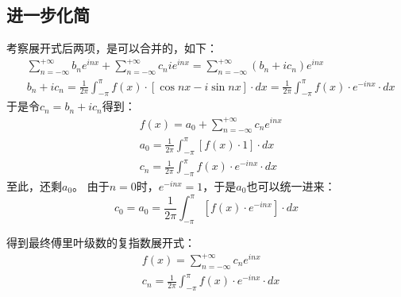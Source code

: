 \subsection{进一步化简}

考察展开式后两项，是可以合并的，如下：
\begin{align*}
&\sum_{n=-\infty}^{+\infty}{b_ne^{inx}}+\sum_{n=-\infty}^{+\infty}{c_nie^{inx}}=\sum_{n=-\infty}^{+\infty}{\left( b_n+ic_n \right) e^{inx}} \\
&b_n+ic_n=\frac{1}{2\pi}\int_{-\pi}^{\pi}{f\left( x \right) \cdot \left[ \cos nx-i\sin nx \right] \cdot dx}=\frac{1}{2\pi}\int_{-\pi}^{\pi}{f\left( x \right) \cdot e^{-inx}\cdot dx}
\end{align*}
于是令$c_n=b_n+ic_n$得到：
\begin{align*}
&f\left( x \right) =a_0+\sum_{n=-\infty}^{+\infty}{c_ne^{inx}} \\
&a_0=\frac{1}{2\pi}\int_{-\pi}^{\pi}{\left[ f\left( x \right) \cdot 1 \right] \cdot dx} \\
&c_n=\frac{1}{2\pi}\int_{-\pi}^{\pi}{f\left( x \right) \cdot e^{-inx}\cdot dx}
\end{align*}
至此，还剩$a_0$。
由于$n=0$时，$e^{-inx}=1$，于是$a_0$也可以统一进来：
\[
c_0=a_0=\frac{1}{2\pi}\int_{-\pi}^{\pi}{\left[ f\left( x \right) \cdot e^{-inx} \right] \cdot dx}
\]

得到最终傅里叶级数的复指数展开式：
\begin{align*}
&f\left( x \right) =\sum_{n=-\infty}^{+\infty}{c_ne^{inx}} \\
&c_n=\frac{1}{2\pi}\int_{-\pi}^{\pi}{f\left( x \right) \cdot e^{-inx}\cdot dx}
\end{align*}





